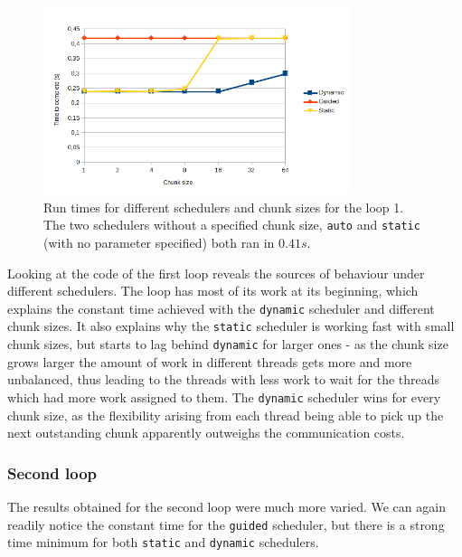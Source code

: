 \documentclass[11pt,a4paper]{article}
\begin{document}
\begin{figure}[h!]
    \begin{center}
        \includegraphics[width=0.8\textwidth]{loop1.png}
    \end{center}
    \caption{Run times for different schedulers and chunk sizes for the loop 1. The two schedulers without a specified chunk size, \texttt{auto} and \texttt{static} (with no parameter specified) both ran in \(0.41s\).}
    \label{loop1}
\end{figure}

Looking at the code of the first loop reveals the sources of behaviour under different schedulers. The loop has most of its work at its beginning, which explains the constant time achieved with the \texttt{dynamic} scheduler and different chunk sizes. It also explains why the \texttt{static} scheduler is working fast with small chunk sizes, but starts to lag behind \texttt{dynamic} for larger ones - as the chunk size grows larger the amount of work in different threads gets more and more unbalanced, thus leading to the threads with less work to wait for the threads which had more work assigned to them. The \texttt{dynamic} scheduler wins for every chunk size, as the flexibility arising from each thread being able to pick up the next outstanding chunk apparently outweighs the communication costs.

\subsubsection{Second loop}
\label{second}
The results obtained for the second loop were much more varied. We can again readily notice the constant time for the \texttt{guided} scheduler, but there is a strong time minimum for both \texttt{static} and \texttt{dynamic} schedulers.
\end{document}
